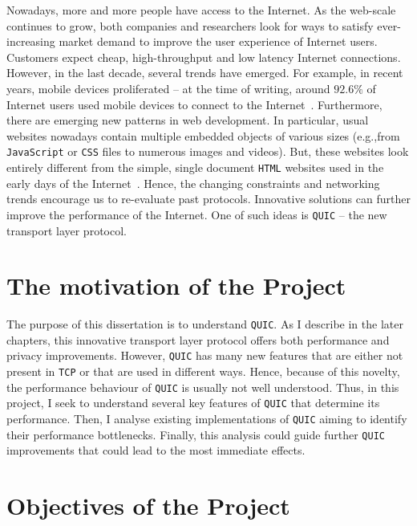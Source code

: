 \documentclass[12pt,a4paper]{report}
\begin{document}
Nowadays, more and more people have access to the Internet.
As the web-scale continues to grow, both companies and researchers look for ways to satisfy ever-increasing market demand to improve the user experience of Internet users.
Customers expect cheap, high-throughput and low latency Internet connections.
However, in the last decade, several trends have emerged.
For example, in recent years, mobile devices proliferated -- at the time of writing, around $92.6\%$ of Internet users used mobile devices to connect to the Internet~\cite{bib_number_of_mobile_users}.
Furthermore, there are emerging new patterns in web development.
In particular, usual websites nowadays contain multiple embedded objects of various sizes (e.g.,from \texttt{JavaScript} or \texttt{CSS} files to numerous images and videos)\cite{bib_Netdev_0x13_QUIC_Tutorial}.
But, these websites look entirely different from the simple, single document \texttt{HTML} websites used in the early days of the Internet~\cite{RudmanRiaan2016DW3o}.
Hence, the changing constraints and networking trends encourage us to re-evaluate past protocols.
Innovative solutions can further improve the performance of the Internet. 
One of such ideas is \texttt{QUIC} -- the new transport layer protocol.

\section{The motivation of the Project}

The purpose of this dissertation is to understand \texttt{QUIC}.
As I describe in the later chapters, this innovative transport layer protocol offers both performance and privacy improvements.
However, \texttt{QUIC} has many new features that are either not present in \texttt{TCP} or that are used in different ways.
Hence, because of this novelty, the performance behaviour of \texttt{QUIC} is usually not well understood.
Thus, in this project, I seek to understand several key features of \texttt{QUIC} that determine its performance.
Then, I analyse existing implementations of \texttt{QUIC} aiming to identify their performance bottlenecks.
Finally, this analysis could guide further \texttt{QUIC} improvements that could lead to the most immediate effects.


\section{Objectives of the Project}
\end{document}
